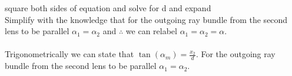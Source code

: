 \documentclass[main.tex]{subfiles}
\begin{document}
square both sides of equation and solve for d and expand \\

Simplify with the knowledge that for the outgoing ray bundle from the second lens to be parallel $\alpha_1 = \alpha_2$ and $\therefore$ we can relabel $\alpha_1 = \alpha_2 =\alpha$.\\

\\ Trigonometrically we can state that $\tan(\alpha_m) = \frac{x_2}{d}$. For the outgoing ray bundle from the second lens to be parallel $\alpha_1 = \alpha_2$.\\

\fi






\end{document}
